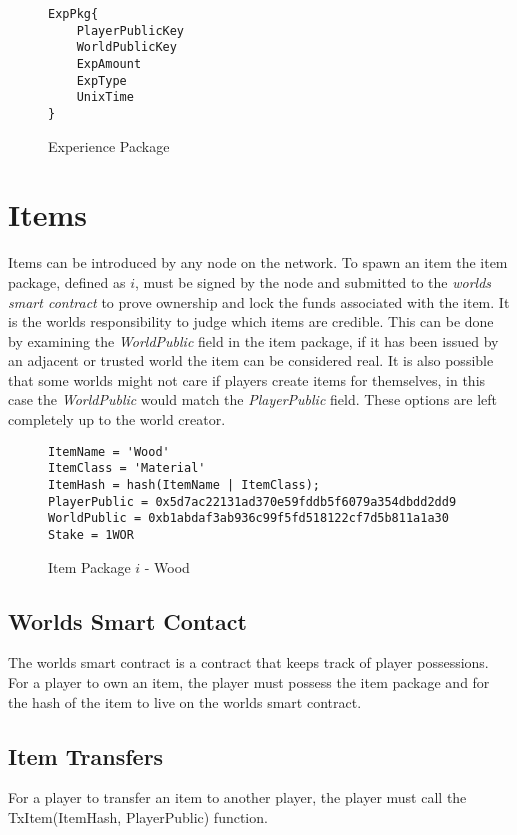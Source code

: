 \documentclass[runningheads,a4paper]{llncs}
\begin{document}
\begin{figure}[H]
\centering
\label{exppkg}
\caption{Experience Package}
\begin{lstlisting}
ExpPkg{
	PlayerPublicKey
	WorldPublicKey
	ExpAmount
	ExpType
	UnixTime
}
\end{lstlisting}
\end{figure}

\section{Items} 

\label{items}
Items can be introduced by any node on the network. To spawn an item the item package, defined as $i$, must be signed by the node and submitted to the \textit{worlds smart contract} to prove ownership and lock the funds associated with the item. It is the worlds responsibility to judge which items are credible. This can be done by examining the \textit{WorldPublic} field in the item package, if it has been issued by an adjacent or trusted world the item can be considered real. It is also possible that some worlds might not care if players create items for themselves, in this case the \textit{WorldPublic} would match the \textit{PlayerPublic} field. These options are left completely up to the world creator.

\begin{figure}[H]
\centering
\label{itempkg}
\caption{Item Package $i$ - Wood}
\begin{lstlisting}
ItemName = 'Wood'
ItemClass = 'Material'
ItemHash = hash(ItemName | ItemClass);
PlayerPublic = 0x5d7ac22131ad370e59fddb5f6079a354dbdd2dd9
WorldPublic = 0xb1abdaf3ab936c99f5fd518122cf7d5b811a1a30
Stake = 1WOR
\end{lstlisting}
\end{figure}

\subsection{Worlds Smart Contact}
The worlds smart contract is a contract that keeps track of player possessions. For a player to own an item, the player must possess the item package and for the hash of the item to live on the worlds smart contract. 

\subsection{Item Transfers}
For a player to transfer an item to another player, the player must call the TxItem(ItemHash, PlayerPublic) function.
\end{document}
